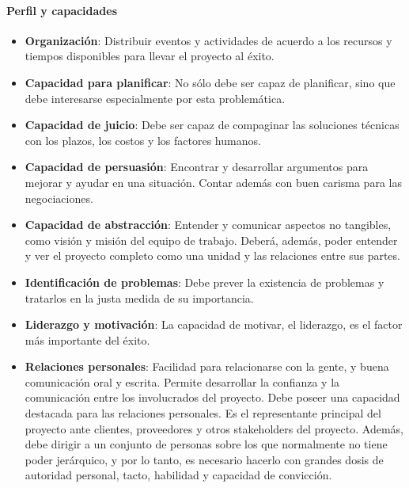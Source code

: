 \paragraph{Perfil y capacidades}
            \begin{itemize}
                \item \textbf{Organización}:
                Distribuir eventos y actividades de acuerdo a los recursos y tiempos disponibles para llevar el proyecto al éxito.
                
                \item \textbf{Capacidad para planificar}:
                No sólo debe ser capaz de planificar, sino que debe interesarse especialmente por esta problemática.
                
                \item \textbf{Capacidad de juicio}:
                Debe ser capaz de compaginar las soluciones técnicas con los plazos, los costos y los factores humanos.
                
                \item \textbf{Capacidad de persuasión}:
                Encontrar y desarrollar argumentos para mejorar y ayudar en una situación.
                Contar además con buen carisma para las negociaciones.
                
                \item \textbf{Capacidad de abstracción}:
                Entender y comunicar aspectos no tangibles, como visión y misión del equipo de trabajo.
                Deberá, además, poder entender y ver el proyecto completo como una unidad y las relaciones entre sus partes.
                
                \item \textbf{Identificación de problemas}:
                Debe prever la existencia de problemas y tratarlos en la justa medida de su importancia.
                
                \item \textbf{Liderazgo y motivación}:
                La capacidad de motivar, el liderazgo, es el factor más importante del éxito.
                
                \item \textbf{Relaciones personales}:
                Facilidad para relacionarse con la gente, y buena comunicación oral y escrita.
                Permite desarrollar la confianza y la comunicación entre los involucrados del proyecto.
                Debe poseer una capacidad destacada para las relaciones personales.
                Es el representante principal del proyecto ante clientes, proveedores y otros stakeholders del proyecto.
                Además, debe dirigir a un conjunto de personas sobre los que normalmente no tiene poder jerárquico, y por lo tanto, es necesario hacerlo con grandes dosis de autoridad personal, tacto, habilidad y capacidad de convicción.
                

\end{itemize}
